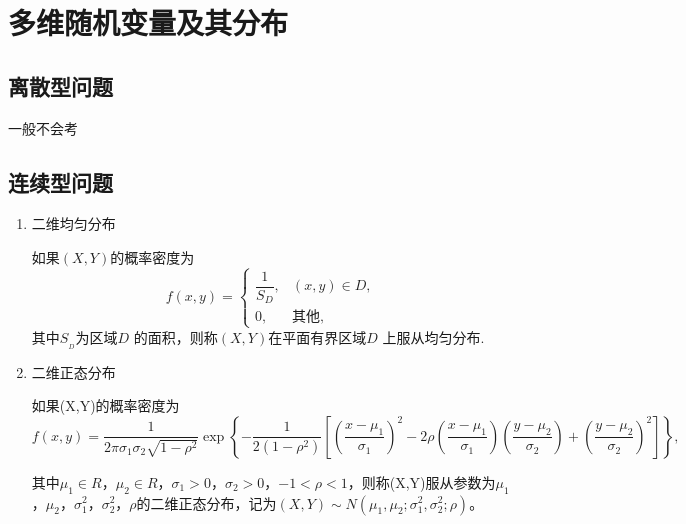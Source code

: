 \chapter{多维随机变量及其分布}

\section{离散型问题}
一般不会考

\section{连续型问题}
\begin{enumerate}
    \item 二维均匀分布

          如果$(X,Y)$的概率密度为
          $$f(x,y)=\begin{cases}\dfrac{1}{S_D},&(x,y)\in D,\\0,&\text{其他,}\end{cases}$$
          其中$S_{_{D}}$为区域$D$ 的面积，则称$(X,Y)$在平面有界区域$D$ 上服从均匀分布.

    \item 二维正态分布

          如果(X,Y)的概率密度为
          $$f(x,y)=\frac{1}{2\pi\sigma_1\sigma_2\sqrt{1-\rho^2}}\exp\left\{-\frac{1}{2(1-\rho^2)}\left[\left(\frac{x-\mu_1}{\sigma_1}\right)^2-2\rho\left(\frac{x-\mu_1}{\sigma_1}\right)\left(\frac{y-\mu_2}{\sigma_2}\right)+\left(\frac{y-\mu_2}{\sigma_2}\right)^2\right]\right\},$$

          其中$\mu_1\in R$，$\mu_2\in R$，$\sigma_1>0$，$\sigma_2>0$，$-1<\rho<1$，则称(X,Y)服从参数为$\mu_1$，$\mu_2$，$\sigma_1^2$，$\sigma_2^2$，$\rho$的二维正态分布，记为$(X,Y)\sim N(\mu_1,\mu_2;\sigma_1^2,\sigma_2^2;\rho)$。

\end{enumerate}
